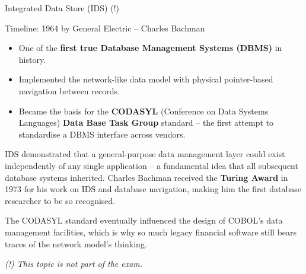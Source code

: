 \begin{frame}{Integrated Data Store (IDS) (!)}
  \begin{block}{Timeline: 1964 by General Electric -- Charles Bachman}
    \begin{itemize}
      \item One of the \textbf{first true Database Management Systems (DBMS)}
            in history.
      \item Implemented the network-like data model with physical pointer-based
            navigation between records.
      \item Became the basis for the \textbf{CODASYL} (Conference on Data
            Systems Languages) \textbf{Data Base Task Group} standard -- the
            first attempt to standardise a DBMS interface across vendors.
    \end{itemize}
  \end{block}

  IDS demonstrated that a general-purpose data management layer could exist
  independently of any single application -- a fundamental idea that all
  subsequent database systems inherited.  Charles Bachman received the
  \textbf{Turing Award} in 1973 for his work on IDS and database navigation,
  making him the first database researcher to be so recognised.

  \medskip
  The CODASYL standard eventually influenced the design of COBOL's data
  management facilities, which is why so much legacy financial software
  still bears traces of the network model's thinking.

  \smallskip
  \textit{(!) This topic is not part of the exam.}
\end{frame}

